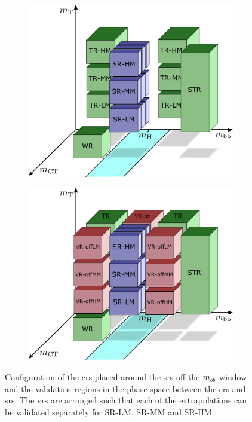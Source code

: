  \begin{figure}[t]
	\centering
	\begin{subfigure}[b]{0.45\linewidth}
		\centering\includegraphics[width=1.0\textwidth]{strategy_5}
		\caption{\label{fig:cr_strategy}}
	\end{subfigure}\hfill
	\begin{subfigure}[b]{0.45\linewidth}
		\centering\includegraphics[width=1.0\textwidth]{strategy_7}
		\caption{\label{fig:vr_strategy}}
	\end{subfigure}\hfill

	\caption{Configuration of  the \glspl{cr} placed around the \glspl{sr} off the $m_{b\hspace{-0.06em}\bar{b}}$ window and  the validation regions in the phase space between the \glspl{cr} and \glspl{sr}. The \glspl{vr} are arranged such that each of the extrapolations can be validated separately for SR-LM, SR-MM and SR-HM.}
	\label{fig:strategies_vr_cr}
\end{figure}

